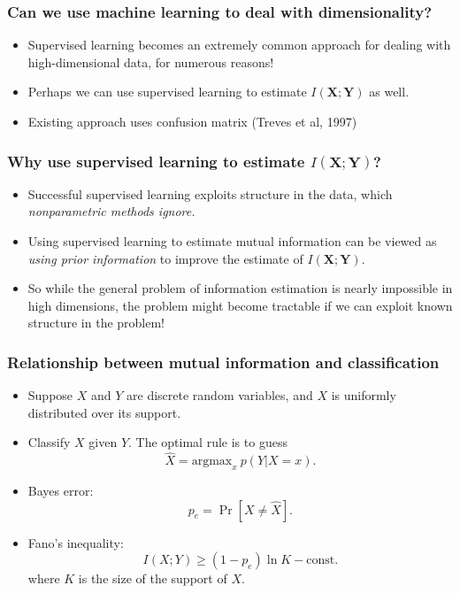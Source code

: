 \documentclass{beamer}
\newcommand{\bX}{\boldsymbol{X}}
\newcommand{\bY}{\boldsymbol{Y}}
\newcommand{\argmax}{\text{argmax}}
\begin{document}
\begin{frame}
\frametitle{Can we use machine learning to deal with dimensionality?}
\begin{itemize}
\item Supervised learning becomes an extremely common approach for dealing with high-dimensional data, for numerous reasons!
\item Perhaps we can use supervised learning to estimate $I(\bX; \bY)$ as well.
\item Existing approach uses confusion matrix (Treves et al, 1997)
\end{itemize}
\end{frame}

\begin{frame}
\frametitle{Why use supervised learning to estimate $I(\bX; \bY)$?}

\begin{itemize}
\item Successful supervised learning exploits structure in the data, which \emph{nonparametric methods ignore.}
\item Using supervised learning to estimate mutual information can be viewed as \emph{using prior information} to improve the estimate of $I(\bX; \bY)$.
\item So while the general problem of information estimation is nearly impossible in high dimensions,
the problem might become tractable if we can exploit known structure in the problem!
\end{itemize}
\end{frame}

\begin{frame}
\frametitle{Relationship between mutual information and classification}
\begin{itemize}
\item Suppose $X$ and $Y$ are discrete random variables, and $X$ is uniformly distributed over its support.
\item Classify $X$ given $Y$.  The optimal rule is to guess
\[
\hat{X} = \argmax_x\ p(Y|X=x).
\]
\item Bayes error:
\[
p_e = \Pr[X \neq \hat{X}].
\]
\item Fano's inequality:
\[
I(X; Y) \geq (1-p_e) \ln K - \text{const.}
\]
where $K$ is the size of the support of $X$.
\end{itemize}
\end{frame}
\end{document}
